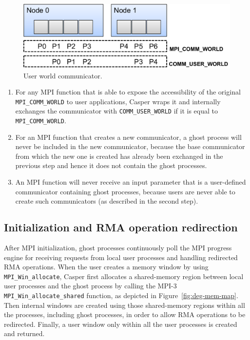 \begin{figure}
\centering
\includegraphics[width=0.9\columnwidth]{figures/casper/design_user_comm.pdf}
\caption{User world communicator.}
\label{fig:deg-user-comm}
\end{figure}

\begin{enumerate}

\item For any MPI function that is able to expose the accessibility of
  the original \texttt{MPI\_COMM\_WORLD} to user applications,
  Casper wraps it and internally exchanges the communicator with
  \texttt{COMM\_USER\_WORLD} if it is equal to
  \texttt{MPI\_COMM\_WORLD}.

\item For an MPI function that creates a new communicator, a ghost
    process will never be included in the new communicator, because
    the base communicator from which the new one is created has
    already been exchanged in the previous
    step and hence it does not contain the ghost processes.

\item An MPI function will never receive an input parameter that
    is a user-defined communicator containing ghost processes,
    because users are never able to create such communicators (as
    described in the second step).
\end{enumerate}



\subsection{Initialization and RMA operation redirection}\label{sec:des-init}

After MPI initialization, ghost processes
continuously poll the MPI progress engine for receiving requests from local
user processes and handling redirected RMA operations.
When the user creates a memory window by using
\texttt{MPI\_Win\_allocate}, Casper first allocates a shared-memory
region between local user processes and the ghost process by calling
the MPI-3 \texttt{MPI\_Win\_allocate\_shared} function, as depicted in
Figure~\ref{fig:deg-mem-map}.
Then internal windows are created using those shared-memory regions
within all the processes, including ghost processes, in order to allow
RMA operations to be redirected. Finally, a user window only within
all the user processes is created and returned.

